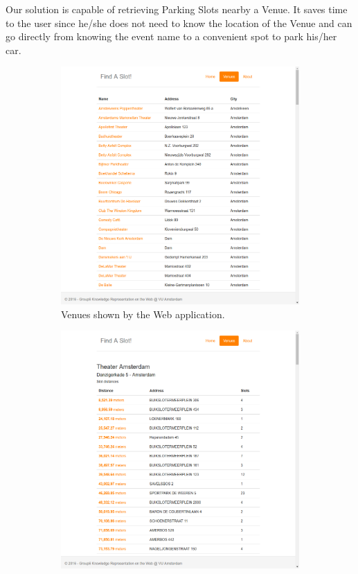 \documentclass[runningheads,a4paper]{../../StyleFiles/llncs}
\begin{document}
Our solution is capable of retrieving Parking Slots nearby a Venue. It saves time to the user since he/she does not need to know the location of the Venue and can go directly from knowing the event name to a convenient spot to park his/her car. 

\begin{figure}
	\centering
	\begin{subfigure}[b]{.4\textwidth}
		\includegraphics[width=\textwidth]{img/app-venues.png}
		\caption{Venues shown by the Web application.}
		\label{fig:app-venues}
	\end{subfigure}
	\qquad
	\begin{subfigure}[b]{.4\textwidth}
		\includegraphics[width=\textwidth]{img/app-slots.png}

\end{subfigure}
\end{figure}
\end{document}
